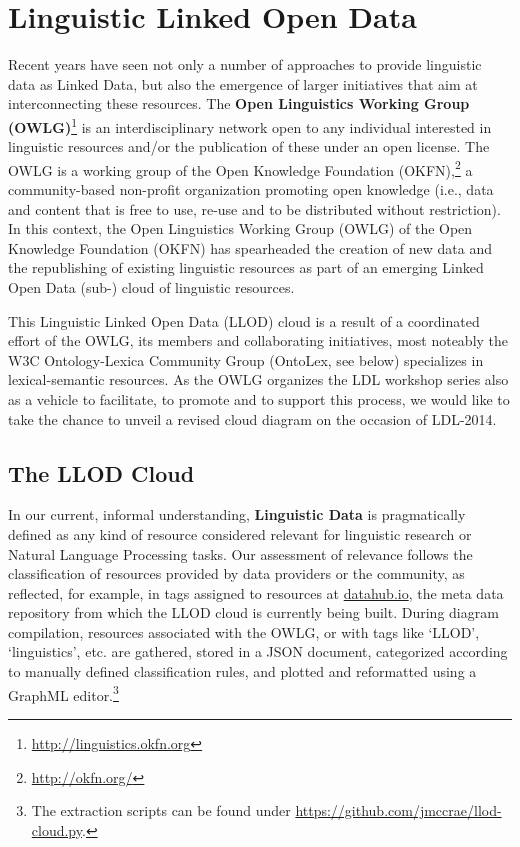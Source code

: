 \section{Linguistic Linked Open Data} %

Recent years have seen not only a number of approaches to provide linguistic data as Linked Data, but also the emergence of larger initiatives that aim at interconnecting these resources.
The \textbf{Open Linguistics Working Group (OWLG)}\footnote{\url{http://linguistics.okfn.org}} is an interdisciplinary network open to any individual interested in linguistic resources and/or the publication of these under an open license. The OWLG is a working group of the Open Knowledge Foundation (OKFN),\footnote{\url{http://okfn.org/}} a community-based non-profit organization promoting open knowledge (i.e., data and content that is free to use, re-use and to be distributed without restriction).
In this context, the Open Linguistics Working Group (OWLG) of the Open Knowledge Foundation (OKFN) has spearheaded the creation of 
new data and the republishing of existing linguistic resources as part of an emerging Linked Open Data (sub-) cloud of linguistic resources. 

This Linguistic Linked Open Data (LLOD) cloud is a result of a coordinated effort of the OWLG, its members and collaborating initiatives, most noteably the W3C Ontology-Lexica Community Group (OntoLex, see below) specializes in lexical-semantic resources.
As the OWLG organizes the LDL workshop series also as a vehicle to facilitate, to promote and to support this process, we would like to take the chance to unveil a revised cloud diagram on the occasion of LDL-2014.

\subsection{The LLOD Cloud}

In our current, informal understanding, \textbf{Linguistic Data} is pragmatically defined as any kind of resource considered relevant for linguistic research or Natural Language Processing tasks. 
Our assessment of relevance follows the classification of resources provided by data providers or the community, as reflected, for example, in tags assigned to resources at \url{datahub.io}, the meta data repository from which the LLOD cloud is currently being built. During diagram compilation, resources associated with the OWLG, or with tags like `LLOD', `linguistics', etc. are gathered, stored in a JSON document, categorized according to manually defined classification rules, and plotted and reformatted using a GraphML editor.\footnote{
	The extraction scripts can be found under \url{https://github.com/jmccrae/llod-cloud.py}.
}

